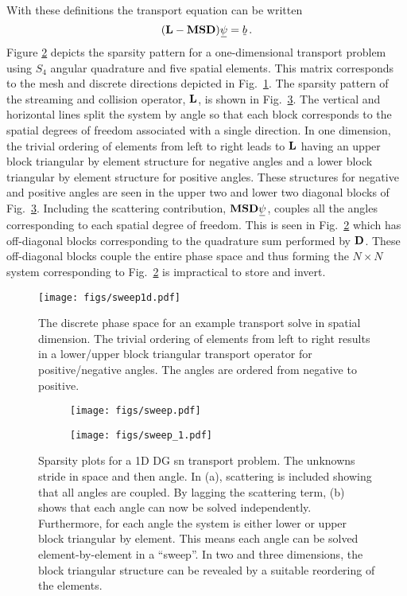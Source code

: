 \documentclass[../doc.tex]{subfiles}
\begin{document}
With these definitions the transport equation can be written 
	\begin{equation}
		(\mat{L} - \mat{M}\mat{S}\mat{D})\ubar{\psi} = \ubar{b} \,. 
	\end{equation}
Figure \ref{sn:discrete_full} depicts the sparsity pattern for a one-dimensional transport problem using $S_4$ angular quadrature and five spatial elements. This matrix corresponds to the mesh and discrete directions depicted in Fig.~\ref{sn:sweep1d}. The sparsity pattern of the streaming and collision operator, $\boldsymbol{\mathrm{L}}$, is shown in Fig.~\ref{sn:discrete_lag}. The vertical and horizontal lines split the system by angle so that each block corresponds to the spatial degrees of freedom associated with a single direction. 
In one dimension, the trivial ordering of elements from left to right leads to $\boldsymbol{\mathrm{L}}$ having an upper block triangular by element structure for negative angles and a lower block triangular by element structure for positive angles. These structures for negative and positive angles are seen in the upper two and lower two diagonal blocks of Fig.~\ref{sn:discrete_lag}. Including the scattering contribution, $\mat{M}\mat{S}\mat{D}\ubar{\psi}$, couples all the angles corresponding to each spatial degree of freedom. This is seen in Fig.~\ref{sn:discrete_full} which has off-diagonal blocks corresponding to the quadrature sum performed by $\boldsymbol{\mathrm{D}}$. These off-diagonal blocks couple the entire phase space and thus forming the $N\times N$ system corresponding to Fig.~\ref{sn:discrete_full} is impractical to store and invert. 
\begin{figure}
\centering
\texttt{[image: figs/sweep1d.pdf]}
\caption{The discrete phase space for an example transport solve in spatial dimension. The trivial ordering of elements from left to right results in a lower/upper block triangular transport operator for positive/negative angles. The angles are ordered from negative to positive. }
\label{sn:sweep1d}
\end{figure}
\begin{figure}
\centering
\begin{subfigure}{.49\textwidth}
	\centering
	\texttt{[image: figs/sweep.pdf]}
	\caption{}
	\label{sn:discrete_full}
\end{subfigure}
\begin{subfigure}{.49\textwidth}
	\centering
	\texttt{[image: figs/sweep\_1.pdf]}
	\caption{}
	\label{sn:discrete_lag}
\end{subfigure}
\caption{Sparsity plots for a 1D DG \gls{sn} transport problem. The unknowns stride in space and then angle. In (a), scattering is included showing that all angles are coupled. By lagging the scattering term, (b) shows that each angle can now be solved independently. Furthermore, for each angle the system is either lower or upper block triangular by element. This means each angle can be solved element-by-element in a ``sweep''. In two and three dimensions, the block triangular structure can be revealed by a suitable reordering of the elements.}
\label{sn:sweep}
\end{figure}
\end{document}
